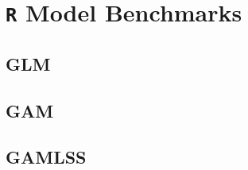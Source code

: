 \section{\texttt{R} Model Benchmarks}

\begin{landscape}
\subsection{GLM}



\subsection{GAM}



\subsection{GAMLSS}



\end{landscape}

